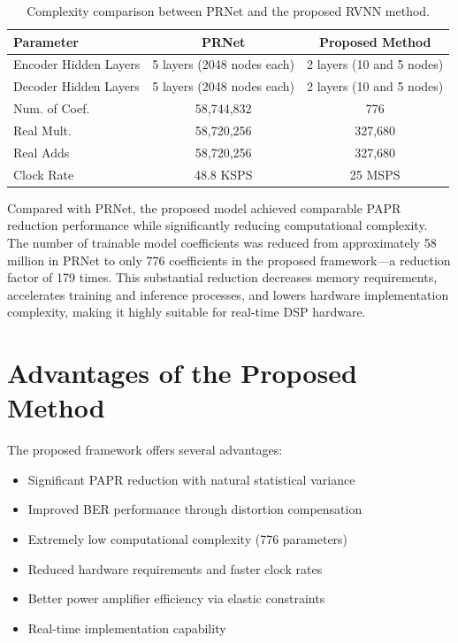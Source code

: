 \begin{table}[H]
    \centering
    \caption{Complexity comparison between PRNet and the proposed RVNN method.}
    \label{tab:complexity_comparison}
    \begin{tabular}{@{} l c c @{}}
        \toprule
        \textbf{Parameter}    & \textbf{PRNet \cite{liu2020low}} & \textbf{Proposed Method}  \\
        \midrule
        Encoder Hidden Layers & 5 layers (2048 nodes each)       & 2 layers (10 and 5 nodes) \\
        Decoder Hidden Layers & 5 layers (2048 nodes each)       & 2 layers (10 and 5 nodes) \\
        Num. of Coef.         & 58,744,832                       & 776                       \\
        Real Mult.            & 58,720,256                       & 327,680                   \\
        Real Adds             & 58,720,256                       & 327,680                   \\
        Clock Rate            & 48.8 KSPS                        & 25 MSPS                   \\
        \bottomrule
    \end{tabular}
\end{table}

Compared with PRNet, the proposed model achieved comparable PAPR reduction performance while significantly reducing computational complexity. The number of trainable model coefficients was reduced from approximately 58 million in PRNet to only 776 coefficients in the proposed framework—a reduction factor of 179 times. This substantial reduction decreases memory requirements, accelerates training and inference processes, and lowers hardware implementation complexity, making it highly suitable for real-time DSP hardware.

\section{Advantages of the Proposed Method}

The proposed framework offers several advantages:

\begin{itemize}
    \item Significant PAPR reduction with natural statistical variance
    \item Improved BER performance through distortion compensation
    \item Extremely low computational complexity (776 parameters)
    \item Reduced hardware requirements and faster clock rates
    \item Better power amplifier efficiency via elastic constraints
    \item Real-time implementation capability
\end{itemize}

